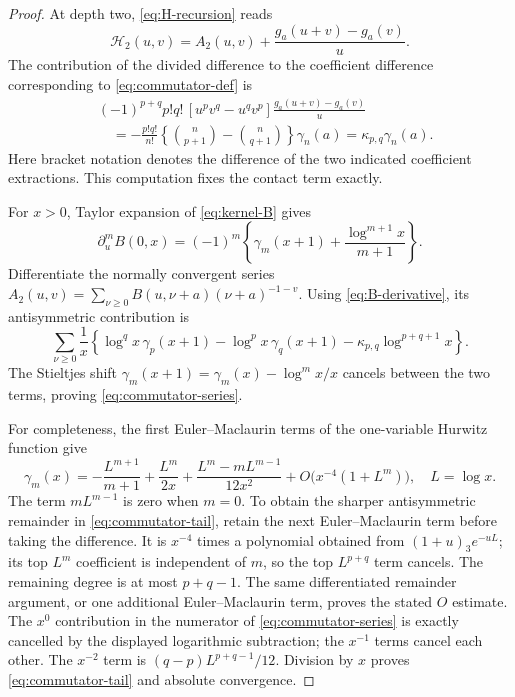 \documentclass[11pt]{article}
\numberwithin{equation}{section}
\theoremstyle{definition}
\newcommand{\HH}{\mathcal H}
\begin{document}
\begin{proof}
At depth two, \eqref{eq:H-recursion} reads
\[
 \HH_2(u,v)=A_2(u,v)+\frac{g_a(u+v)-g_a(v)}u.
\]
The contribution of the divided difference to the coefficient difference
corresponding to \eqref{eq:commutator-def} is
\begin{align*}
 &(-1)^{p+q}p!q!\,[u^pv^q-u^qv^p]
                   \frac{g_a(u+v)-g_a(v)}u\\
 &\quad=-\frac{p!q!}{n!}
     \left\{\binom n{p+1}-\binom n{q+1}\right\}\gamma_n(a)
       =\kappa_{p,q}\gamma_n(a).
\end{align*}
Here bracket notation denotes the difference of the two indicated
coefficient extractions. This computation fixes the contact term exactly.

For $x>0$, Taylor expansion of \eqref{eq:kernel-B} gives
\begin{equation}\label{eq:B-derivative}
 \partial_u^mB(0,x)=(-1)^m
       \left\{\gamma_m(x+1)+\frac{\log^{m+1}x}{m+1}\right\}.
\end{equation}
Differentiate the normally convergent series
$A_2(u,v)=\sum_{\nu\ge0}B(u,\nu+a)(\nu+a)^{-1-v}$.
Using \eqref{eq:B-derivative}, its antisymmetric contribution is
\[
 \sum_{\nu\ge0}\frac1x
 \left\{\log^q x\,\gamma_p(x+1)
       -\log^p x\,\gamma_q(x+1)
       -\kappa_{p,q}\log^{p+q+1}x\right\}.
\]
The Stieltjes shift
$\gamma_m(x+1)=\gamma_m(x)-\log^m x/x$ cancels between the two
terms, proving \eqref{eq:commutator-series}.

For completeness, the first Euler--Maclaurin terms of the one-variable
Hurwitz function give
\begin{equation}\label{eq:gamma-asym}
 \gamma_m(x)=-\frac{L^{m+1}}{m+1}+\frac{L^m}{2x}
       +\frac{L^m-mL^{m-1}}{12x^2}
       +O\bigl(x^{-4}(1+L^m)\bigr),\quad L=\log x.
\end{equation}
The term $mL^{m-1}$ is zero when $m=0$. To obtain the sharper
antisymmetric remainder in \eqref{eq:commutator-tail}, retain the next
Euler--Maclaurin term before taking the difference. It is $x^{-4}$ times
a polynomial obtained from $(1+u)_3e^{-uL}$; its top $L^m$ coefficient is
independent of $m$, so the top $L^{p+q}$ term cancels. The remaining degree
is at most $p+q-1$. The same differentiated remainder argument, or one
additional Euler--Maclaurin term, proves the stated $O$ estimate. The
$x^0$ contribution in the numerator of
\eqref{eq:commutator-series} is exactly cancelled by the displayed
logarithmic subtraction; the $x^{-1}$ terms cancel each other. The
$x^{-2}$ term is $(q-p)L^{p+q-1}/12$. Division by $x$ proves
\eqref{eq:commutator-tail} and absolute convergence.
\end{proof}
\end{document}
